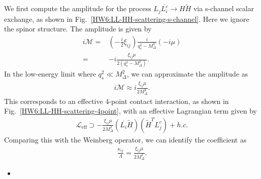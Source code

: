 We first compute the amplitude for the process $L_j \overline{L_i^c} \to H \tilde{H}$ via s-channel scalar exchange, as shown in Fig.~\ref{HW6:LL-HH-scattering-s-channel}. Here we ignore the spinor structure. The amplitude is given by
\begin{align}
    i\mathcal{M}=&\left(-\frac{i}{2}\xi_{ij} \right) \frac{i}{q_s^2 - M_\Delta^2} (-i\mu)\\
    =& -i \frac{\xi_{ij} \mu}{2 (q_s^2 - M_\Delta^2)} .
\end{align}
In the low-energy limit where $q_s^2 \ll M_\Delta^2$, we can approximate the amplitude as
\begin{align}
    i\mathcal{M} \approx i \frac{\xi_{ij} \mu}{2 M_\Delta^2} .
\end{align}
This corresponds to an effective 4-point contact interaction, as shown in Fig.~\ref{HW6:LL-HH-scattering-4point}, with an effective Lagrangian term given by
\begin{align}
    \mathcal{L}_\text{eff} \supset - \frac{\xi_{ij} \mu}{2 M_\Delta^2} (\overline{L_i}\tilde{H})(\tilde{H}^T L_j^c) + h.c.
\end{align}
Comparing this with the Weinberg operator, we can identify the coefficient as
\begin{align}
    \frac{\kappa_{ij}}{\Lambda} = \frac{\xi_{ij} \mu}{2 M_\Delta^2}.
\end{align}

\begin{itemize}
    \item [(c)]
\end{itemize}

